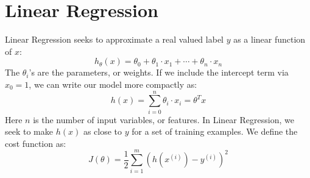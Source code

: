 \documentclass[twoside,twocolumn]{article}
\begin{document}
\section{Linear Regression}
Linear Regression seeks to approximate a real valued label $y$ as a
linear function of $x$:
\begin{equation}
  h_{\theta}(x) = \theta_0 + \theta_1 \cdot x_1 + \cdots + \theta_n \cdot x_n
\end{equation}
The $\theta_i$'s are the parameters, or weights. If we include the
intercept term via $x_0=1$, we can write our model more compactly as:
\begin{equation}
  h(x) = \sum_{i=0}^{n} \theta_i \cdot x_i = \theta^T x
\end{equation}
Here $n$ is the number of input variables, or features. In Linear Regression,
we seek to make $h(x)$ as close to $y$ for a set of training examples. We
define the cost function as:
\begin{equation}
  J(\theta) = \frac{1}{2} \sum_{i=1}^{m} \left( h \left(x^{(i)}\right) - y^{(i)}\right)^2
\end{equation}
\end{document}
